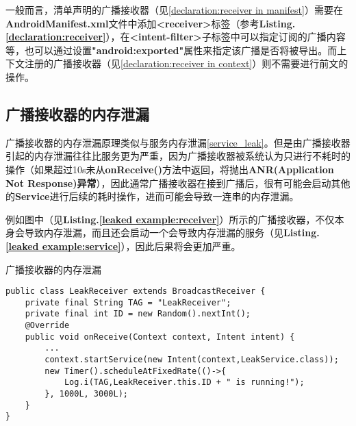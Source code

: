 一般而言，清单声明的广播接收器（见\ref{declaration:receiver in manifest}）需要在\textbf{AndroidManifest.xml}文件中添加\textbf{<receiver>}标签（参考\textbf{Listing.\textcolor{red}{\ref{declaration:receiver}}}），在\textbf{<intent-filter>}子标签中可以指定订阅的广播内容等，也可以通过设置\textbf{"android:exported"}属性来指定该广播是否将被导出。而上下文注册的广播接收器（见\ref{declaration:receiver in context}）则不需要进行前文的操作。
\subsection{广播接收器的内存泄漏}
广播接收器的内存泄漏原理类似与服务内存泄漏\ref{service_leak}。但是由广播接收器引起的内存泄漏往往比服务更为严重，因为广播接收器被系统认为只进行不耗时的操作（如果超过10s未从\textbf{onReceive()}方法中返回，将抛出\textbf{ANR(Application Not Response)异常}），因此通常广播接收器在接到广播后，很有可能会启动其他的\textbf{Service}进行后续的耗时操作，进而可能会导致一连串的内存泄漏。

例如图中（见\textbf{Listing.\textcolor{red}{\ref{leaked example:receiver}}}）所示的广播接收器，不仅本身会导致内存泄漏，而且还会启动一个会导致内存泄漏的服务（见\textbf{Listing.\textcolor{red}{\ref{leaked example:service}}}），因此后果将会更加严重。
\begin{listing}[htbp]
	\centering
	\caption{广播接收器的内存泄漏}
	\begin{verbatim}
public class LeakReceiver extends BroadcastReceiver {
	private final String TAG = "LeakReceiver";
	private final int ID = new Random().nextInt();
	@Override
	public void onReceive(Context context, Intent intent) {
		...
		context.startService(new Intent(context,LeakService.class));
		new Timer().scheduleAtFixedRate(()->{
			Log.i(TAG,LeakReceiver.this.ID + " is running!");
		}, 1000L, 3000L);
	}
}
	\end{verbatim}
	\label{leaked example:receiver}
\end{listing}